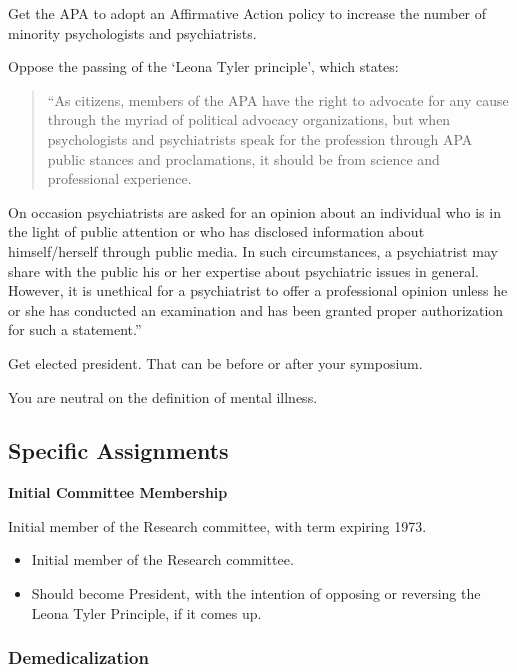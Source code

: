 \begin{refsection}
Get the APA to adopt an Affirmative Action policy to increase the number of minority psychologists and psychiatrists.

Oppose the passing of the `Leona Tyler principle', which states:

\begin{quote}

“As citizens, members of the APA have the right to advocate for any cause through the myriad of political advocacy organizations, but when psychologists and psychiatrists speak for the profession through APA public stances and proclamations, it should be from science and professional experience. 
\end{quote}

On occasion psychiatrists are asked for an opinion about an individual who is in the light of public attention or who has disclosed information about himself\slash herself through public media. In such circumstances, a psychiatrist may share with the public his or her expertise about psychiatric issues in general. However, it is unethical for a psychiatrist to offer a professional opinion unless he or she has conducted an examination and has been granted proper authorization for such a statement.”

Get elected president. That can be before or after your symposium.

You are neutral on the definition of mental illness. 

\subsection{Specific Assignments}
\label{specificassignments}

\textbf{Initial Committee Membership}\begin{service}[Clark]\label{service:clark}
Initial member of the Research committee, with term expiring 1973. 
\end{service}

\begin{itemize}
\item Initial member of the Research committee.

\item Should become President, with the intention of opposing or reversing the Leona Tyler Principle, if it comes up.

\end{itemize}

\subsubsection{Demedicalization}
\label{demedicalization}


\end{refsection}

